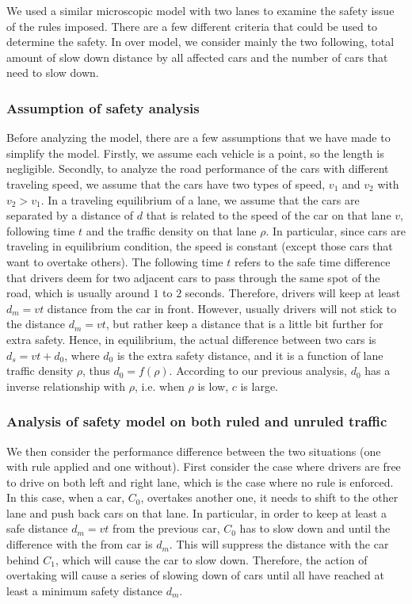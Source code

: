 We used a similar microscopic model with two lanes to examine the safety issue of the rules imposed. There are a few different criteria that could be used to determine the safety. In over model, we consider mainly the two following, total amount of slow down distance by all affected cars and the number of cars that need to slow down. 

\subsubsection{Assumption of safety analysis}

Before analyzing the model, there are a few assumptions that we have made to simplify the model. Firstly, we assume each vehicle is a point, so the length is negligible. Secondly, to analyze the road performance of the cars with different traveling speed, we assume that the cars have two types of speed, $v_1$ and $v_2$ with $v_2 > v_1$. In a traveling equilibrium of a lane, we assume that the cars are separated by a distance of $d$ that is related to the speed of the car on that lane $v$, following time $t$ and the traffic density on that lane $\rho$. In particular, since cars are traveling in equilibrium condition, the speed is constant (except those cars that want to overtake others). The following time $t$ refers to the safe time difference that drivers deem for two adjacent cars to pass through the same spot of the road, which is usually around $1$ to $2$ seconds. Therefore, drivers will keep at least $d_m = vt$ distance from the car in front. However, usually drivers will not stick to the distance $d_m = vt$, but rather keep a distance that is a little bit further for extra safety. Hence, in equilibrium, the actual difference between two cars is $d_s = vt + d_0$, where $d_0$ is the extra safety distance, and it is a function of lane traffic density $\rho$, thus $d_0 = f(\rho)$. According to our previous analysis, $d_0$ has a inverse relationship with $\rho$, i.e. when $\rho$ is low, $c$ is large.

\subsubsection{Analysis of safety model on both ruled and unruled traffic}

We then consider the performance difference between the two situations (one with rule applied and one without). First consider the case where drivers are free to drive on both left and right lane, which is the case where no rule is enforced. In this case, when a car, $C_0$, overtakes another one, it needs to shift to the other lane and push back cars on that lane. In particular, in order to keep at least a safe distance $d_m = vt$ from the previous car, $C_0$ has to slow down and until the difference with the from car is $d_m$. This will suppress the distance with the car behind $C_1$, which will cause the car to slow down. Therefore, the action of overtaking will cause a series of slowing down of cars until all have reached at least a minimum safety distance $d_m$. 

